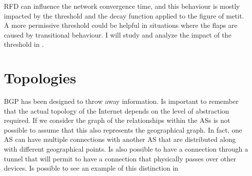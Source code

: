 \ac{RFD} can influence the network convergence time, and this behaviour is
mostly impacted by the threshold and the decay function applied to the figure
of metit.
A more permissive threshold could be helpful in situations where the flaps are
caused by transitional behaviour.
I will study and analyze the impact of the threshold in .


\section{Topologies}
\label{sec:topologies}

%

\ac{BGP} has been designed to throw away information.
Is important to remember that the actual topology of the Internet depends on the
level of abstraction required.
If we consider the graph of the relationships within the \acp{AS} is not
possible to assume that this also represents the geographical graph.
In fact, one \ac{AS} can have multiple connections with another \ac{AS}
that are distributed along with different geographical points.
Is also possible to have a connection through a tunnel that will permit to have
a connection that physically passes over other devices.
Is possible to see an example of this distinction in 

